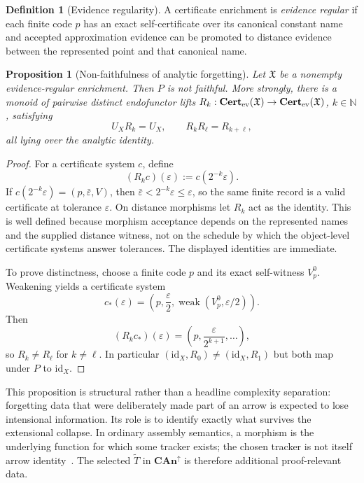 \documentclass[11pt]{article}
\newtheorem{proposition}[theorem]{Proposition}
\theoremstyle{definition}
\newtheorem{definition}[theorem]{Definition}
\newcommand{\N}{\mathbb{N}}
\newcommand{\Cert}{\mathbf{Cert}}
\newcommand{\id}{\mathrm{id}}
\begin{document}
\begin{definition}[Evidence regularity]\label{def:regular}
A certificate enrichment is \emph{evidence regular} if each finite code $p$ has an exact
self-certificate over its canonical constant name and accepted approximation evidence can
be promoted to distance evidence between the represented point and that canonical name.
\end{definition}

\begin{proposition}[Non-faithfulness of analytic forgetting]\label{thm:nonfaithful}
Let $\mathfrak X$ be a nonempty evidence-regular enrichment.  Then $P$ is not faithful.
More strongly, there is a monoid of pairwise distinct endofunctor lifts
$R_k:\Cert_{\rm ev}(\mathfrak X)\to\Cert_{\rm ev}(\mathfrak X)$, $k\in\N$, satisfying
\[
 U_XR_k=U_X,\qquad R_kR_\ell=R_{k+\ell},
\]
all lying over the analytic identity.
\end{proposition}

\begin{proof}
For a certificate system $c$, define
\[
 (R_kc)(\varepsilon):=c(2^{-k}\varepsilon).
\]
If $c(2^{-k}\varepsilon)=(p,\bar\varepsilon,V)$, then
$\bar\varepsilon<2^{-k}\varepsilon\le\varepsilon$, so the same finite record is a valid
certificate at tolerance $\varepsilon$.  On distance morphisms let $R_k$ act as the
identity.  This is well defined because morphism acceptance depends on the represented
names and the supplied distance witness, not on the schedule by which the object-level
certificate systems answer tolerances.  The displayed identities are immediate.

To prove distinctness, choose a finite code $p$ and its exact self-witness $V_p^0$.
Weakening yields a certificate system
\[
 c_*(\varepsilon)=\left(p,\frac{\varepsilon}{2},
       \operatorname{weak}(V_p^0,\varepsilon/2)\right).
\]
Then
\[
 (R_kc_*)(\varepsilon)
 =\left(p,\frac{\varepsilon}{2^{k+1}},\ldots\right),
\]
so $R_k\ne R_\ell$ for $k\ne\ell$.  In particular
$(\id_X,R_0)\ne(\id_X,R_1)$ but both map under $P$ to $\id_X$.
\end{proof}

This proposition is structural rather than a headline complexity separation: forgetting data
that were deliberately made part of an arrow is expected to lose intensional information.
Its role is to identify exactly what survives the extensional collapse.  In ordinary
assembly semantics, a morphism is the underlying function for which some tracker exists;
the chosen tracker is not itself arrow identity~\cite{vanOosten}.  The selected
$\widetilde T$ in $\mathbf{CAn}^{\uparrow}$ is therefore additional proof-relevant data.
\end{document}
